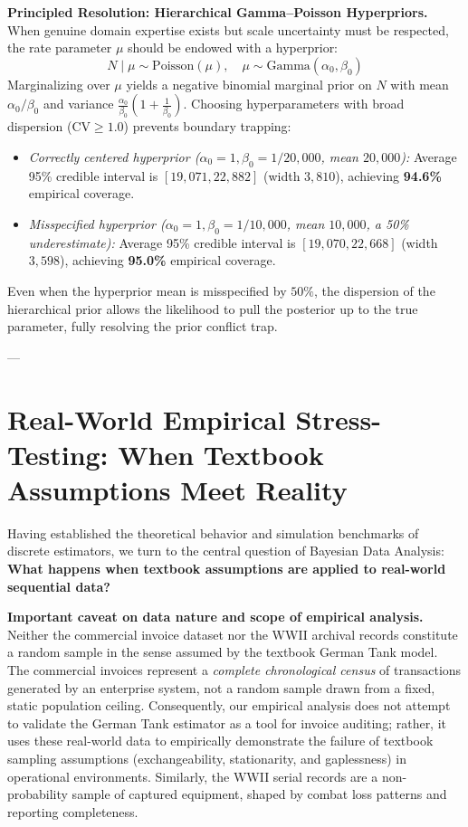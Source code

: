 \documentclass[10pt,a4paper]{article}
\begin{document}
\textbf{Principled Resolution: Hierarchical Gamma--Poisson Hyperpriors.} When genuine domain expertise exists but scale uncertainty must be respected, the rate parameter $\mu$ should be endowed with a hyperprior:
\begin{equation}
N \mid \mu \sim \text{Poisson}(\mu), \quad \mu \sim \text{Gamma}(\alpha_0, \beta_0)
\label{eq:gamma_poisson}
\end{equation}
Marginalizing over $\mu$ yields a negative binomial marginal prior on $N$ with mean $\alpha_0 / \beta_0$ and variance $\frac{\alpha_0}{\beta_0} (1 + \frac{1}{\beta_0})$. Choosing hyperparameters with broad dispersion ($\text{CV} \ge 1.0$) prevents boundary trapping:
\begin{itemize}
    \item \textit{Correctly centered hyperprior ($\alpha_0 = 1, \beta_0 = 1/20,000$, mean $20,000$):} Average 95\% credible interval is $[19,071, 22,882]$ (width $3,810$), achieving \textbf{94.6\%} empirical coverage.
    \item \textit{Misspecified hyperprior ($\alpha_0 = 1, \beta_0 = 1/10,000$, mean $10,000$, a 50\% underestimate):} Average 95\% credible interval is $[19,070, 22,668]$ (width $3,598$), achieving \textbf{95.0\%} empirical coverage.
\end{itemize}
Even when the hyperprior mean is misspecified by $50\%$, the dispersion of the hierarchical prior allows the likelihood to pull the posterior up to the true parameter, fully resolving the prior conflict trap.

---

\section{Real-World Empirical Stress-Testing: When Textbook Assumptions Meet Reality}

Having established the theoretical behavior and simulation benchmarks of discrete estimators, we turn to the central question of Bayesian Data Analysis: \textbf{What happens when textbook assumptions are applied to real-world sequential data?}

\textbf{Important caveat on data nature and scope of empirical analysis.} Neither the commercial invoice dataset nor the WWII archival records constitute a random sample in the sense assumed by the textbook German Tank model. The commercial invoices represent a \emph{complete chronological census} of transactions generated by an enterprise system, not a random sample drawn from a fixed, static population ceiling. Consequently, our empirical analysis does not attempt to validate the German Tank estimator as a tool for invoice auditing; rather, it uses these real-world data to empirically demonstrate the failure of textbook sampling assumptions (exchangeability, stationarity, and gaplessness) in operational environments. Similarly, the WWII serial records are a non-probability sample of captured equipment, shaped by combat loss patterns and reporting completeness.
\end{document}
